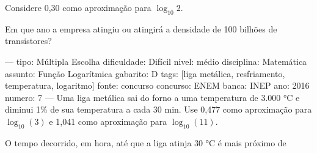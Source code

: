 Considere 0,30 como aproximação para \( \log_{10} 2 \).

Em que ano a empresa atingiu ou atingirá a densidade de 100 bilhões de transistores?
\begin{oneparchoices}
\end{oneparchoices}

---
tipo: Múltipla Escolha
dificuldade: Difícil
nivel: médio
disciplina: Matemática
assunto: Função Logarítmica
gabarito: D
tags: [liga metálica, resfriamento, temperatura, logaritmo]
fonte: concurso
concurso: ENEM
banca: INEP
ano: 2016
numero: 7
---
\question
Uma liga metálica sai do forno a uma temperatura de 3{.}000 °C e diminui 1\% de sua temperatura a cada 30 min. Use 0,477 como aproximação para \( \log_{10}(3) \) e 1,041 como aproximação para \( \log_{10}(11) \).

O tempo decorrido, em hora, até que a liga atinja 30 °C é mais próximo de
\begin{oneparchoices}
\end{oneparchoices}

